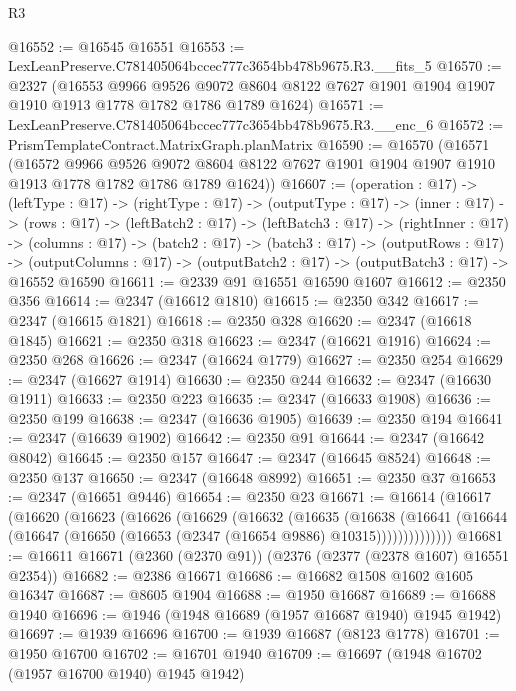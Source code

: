 \begin{lexlean}{R3}
\begin{coremodule}
@16552 := @16545 @16551
@16553 := LexLeanPreserve.C781405064bccec777c3654bb478b9675.R3.__fits_5
@16570 := @2327
    (@16553
      @9966
      @9526
      @9072
      @8604
      @8122
      @7627
      @1901
      @1904
      @1907
      @1910
      @1913
      @1778
      @1782
      @1786
      @1789
      @1624)
@16571 := LexLeanPreserve.C781405064bccec777c3654bb478b9675.R3.__enc_6
@16572 := PrismTemplateContract.MatrixGraph.planMatrix
@16590 := @16570
    (@16571
      (@16572
        @9966
        @9526
        @9072
        @8604
        @8122
        @7627
        @1901
        @1904
        @1907
        @1910
        @1913
        @1778
        @1782
        @1786
        @1789
        @1624))
@16607 := (operation : @17) ->
  (leftType : @17) ->
  (rightType : @17) ->
  (outputType : @17) ->
  (inner : @17) ->
  (rows : @17) ->
  (leftBatch2 : @17) ->
  (leftBatch3 : @17) ->
  (rightInner : @17) ->
  (columns : @17) ->
  (batch2 : @17) ->
  (batch3 : @17) ->
  (outputRows : @17) ->
  (outputColumns : @17) -> (outputBatch2 : @17) -> (outputBatch3 : @17) -> @16552 @16590
@16611 := @2339 @91 @16551 @16590 @1607
@16612 := @2350 @356
@16614 := @2347 (@16612 @1810)
@16615 := @2350 @342
@16617 := @2347 (@16615 @1821)
@16618 := @2350 @328
@16620 := @2347 (@16618 @1845)
@16621 := @2350 @318
@16623 := @2347 (@16621 @1916)
@16624 := @2350 @268
@16626 := @2347 (@16624 @1779)
@16627 := @2350 @254
@16629 := @2347 (@16627 @1914)
@16630 := @2350 @244
@16632 := @2347 (@16630 @1911)
@16633 := @2350 @223
@16635 := @2347 (@16633 @1908)
@16636 := @2350 @199
@16638 := @2347 (@16636 @1905)
@16639 := @2350 @194
@16641 := @2347 (@16639 @1902)
@16642 := @2350 @91
@16644 := @2347 (@16642 @8042)
@16645 := @2350 @157
@16647 := @2347 (@16645 @8524)
@16648 := @2350 @137
@16650 := @2347 (@16648 @8992)
@16651 := @2350 @37
@16653 := @2347 (@16651 @9446)
@16654 := @2350 @23
@16671 := @16614
    (@16617
      (@16620
        (@16623
          (@16626
            (@16629
              (@16632
                (@16635
                  (@16638
                    (@16641
                      (@16644 (@16647 (@16650 (@16653 (@2347 (@16654 @9886) @10315))))))))))))))
@16681 := @16611 @16671 (@2360 (@2370 @91)) (@2376 (@2377 (@2378 @1607) @16551 @2354))
@16682 := @2386 @16671
@16686 := @16682 @1508 @1602 @1605 @16347
@16687 := @8605 @1904
@16688 := @1950 @16687
@16689 := @16688 @1940
@16696 := @1946 (@1948 @16689 (@1957 @16687 @1940) @1945 @1942)
@16697 := @1939 @16696
@16700 := @1939 @16687 (@8123 @1778)
@16701 := @1950 @16700
@16702 := @16701 @1940
@16709 := @16697 (@1948 @16702 (@1957 @16700 @1940) @1945 @1942)

\end{coremodule}
\end{lexlean}
